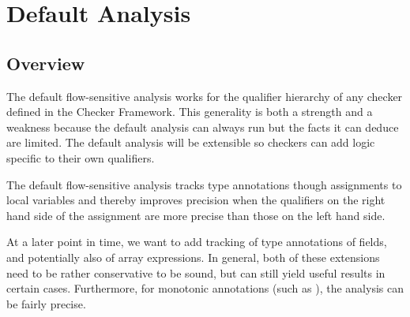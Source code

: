 \section{Default Analysis}

\subsection{Overview}

The default flow-sensitive analysis works for the qualifier hierarchy of any checker defined in 
the Checker Framework.  This generality is both a strength and a weakness because the 
default analysis can
always run but the facts it can deduce are limited.  The default analysis
will be extensible so checkers can add logic specific to their own qualifiers.

The default flow-sensitive analysis tracks type annotations though assignments to local 
variables and thereby improves precision when the qualifiers on the right hand side of the
assignment are more precise than those on the left hand side.

\begin{new}
\begin{workinprogress}
    At a later point in time, we want to add tracking of type annotations of fields, and
    potentially also of array expressions.  In general, both of these extensions need to be
    rather conservative to be sound, but can still yield useful results in certain cases.
    Furthermore, for monotonic annotations (such as ), the analysis can be
    fairly precise.
\end{workinprogress}
\end{new}


